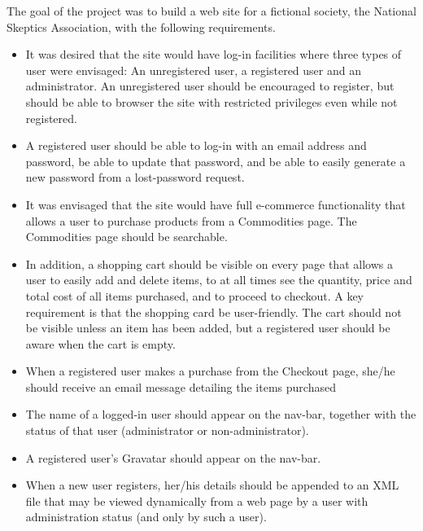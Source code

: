\documentclass[11pt]{article}
\begin{document}
The goal of the project was to build a web site for a fictional society, the National Skeptics Association, with the following
requirements. 
\begin{itemize}
\item[] It was desired that the site would have log-in facilities where three types of user were envisaged: An unregistered user,
a registered user and an administrator. An unregistered user should be encouraged to register, but should be able to browser the site with restricted privileges even while not registered. 
\item[]A registered  user should be able to log-in with an email address and password, be able to update
that password, and be able to easily generate a new password from a lost-password request. 
\item[]It was envisaged that the site would have full e-commerce functionality that allows a user to purchase 
products from a Commodities page. The Commodities page should be searchable. 
\item[]In addition, a shopping cart should be visible on every page that allows a user to easily add and delete items,
to at all times see the quantity, price and total cost of all items purchased, and to proceed to checkout. A key requirement
is that the shopping card be user-friendly.  The cart should not be visible unless an item has been added, but a registered user
should be aware when the cart is empty.  
\item[] When a registered user makes a purchase from the Checkout page, she/he should receive an email message detailing the items purchased
\item[] The name of a logged-in user should appear on the nav-bar, together with the status of that user (administrator or non-administrator). 
\item[] A registered user's Gravatar should appear on the nav-bar.
\item[]When a new user registers, her/his details should be appended to an XML file that may be viewed dynamically from
a web page by a user with administration status (and only by such a user).


\end{itemize}
\end{document}
